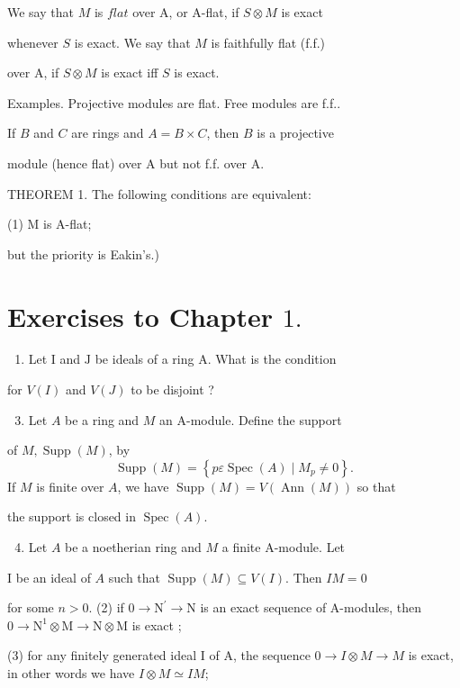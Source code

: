 We say that $M$ is $f l a t$ over A, or A-flat, if $S \otimes M$ is exact

whenever $S$ is exact. We say that $M$ is faithfully flat (f.f.)

over A, if $S \otimes M$ is exact iff $S$ is exact.

Examples. Projective modules are flat. Free modules are f.f..

If $B$ and $C$ are rings and $A=B \times C$, then $B$ is a projective

module (hence flat) over A but not f.f. over A.

THEOREM 1. The following conditions are equivalent:

(1) M is A-flat;

but the priority is Eakin's.)

\section{Exercises to Chapter $1 .$}
\begin{enumerate}
  \item Let I and $\mathrm{J}$ be ideals of a ring A. What is the condition
\end{enumerate}
for $V(I)$ and $V(J)$ to be disjoint ?

\begin{enumerate}
  \setcounter{enumi}{2}
  \item Let $A$ be a ring and $M$ an A-module. Define the support
\end{enumerate}
of $M, \operatorname{Supp}(M)$, by
$$
\operatorname{Supp}(M)=\left\{p \varepsilon \operatorname{Spec}(A) \mid M_{p} \neq 0\right\} .
$$
If $M$ is finite over $A$, we have $\operatorname{Supp}(M)=V(\operatorname{Ann}(M))$ so that

the support is closed in $\operatorname{Spec}(A)$.

\begin{enumerate}
  \setcounter{enumi}{3}
  \item Let $A$ be a noetherian ring and $M$ a finite A-module. Let
\end{enumerate}
I be an ideal of $A$ such that $\operatorname{Supp}(M) \subseteq V(I)$. Then $I M=0$

for some $n>0$. (2) if $0 \rightarrow \mathrm{N}^{\prime} \rightarrow \mathrm{N}$ is an exact sequence of A-modules, then $0 \rightarrow \mathrm{N}^{1} \otimes \mathrm{M} \rightarrow \mathrm{N} \otimes \mathrm{M}$ is exact ;

(3) for any finitely generated ideal I of A, the sequence $0 \rightarrow I \otimes M \rightarrow M$ is exact, in other words we have $I \otimes M \simeq I M$;

